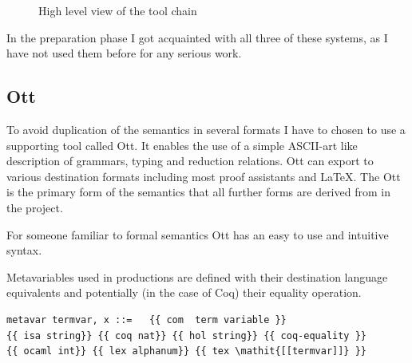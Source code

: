 \documentclass[12pt,twoside,notitlepage]{report}
\begin{document}
\begin{figure}[h!]
\centering

\caption{High level view of the tool chain}
\end{figure}

In the preparation phase I got acquainted with all three of these systems, as I have not used them before for any serious work.
\subsection{Ott}
To avoid duplication of the semantics in several formats I have to chosen to use a supporting tool called Ott. It enables the use of a simple ASCII-art like description of grammars, typing and reduction relations. Ott can export to various destination formats including most proof assistants and \LaTeX. The Ott  is the primary form of the semantics that all further forms are derived from in the project.

For someone familiar to formal semantics Ott has an easy to use and intuitive syntax. 

Metavariables used in productions are defined with their destination language equivalents and potentially (in the case of Coq) their equality operation.
\begin{lstlisting}[language={Ott}, caption={Ott metavariable definition}]
metavar termvar, x ::=   {{ com  term variable }} 
{{ isa string}} {{ coq nat}} {{ hol string}} {{ coq-equality }}
{{ ocaml int}} {{ lex alphanum}} {{ tex \mathit{[[termvar]]} }}
\end{lstlisting}
\end{document}
